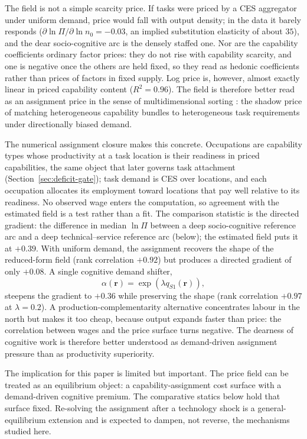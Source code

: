 \documentclass[12pt, a4paper]{article}
\begin{document}
The field is not a simple scarcity price. If tasks were priced by a CES
aggregator under uniform demand, price would fall with output density;
in the data it barely responds
($\partial\ln\Pi/\partial\ln n_0 = -0.03$, an implied substitution
elasticity of about $35$), and the dear socio-cognitive arc is the
densely staffed one. Nor are the capability coefficients ordinary
factor prices: they do not rise with capability scarcity, and one is
negative once the others are held fixed, so they read as hedonic
coefficients rather than prices of factors in fixed supply. Log price
is, however, almost exactly linear in priced capability content
($R^2 = 0.96$). The field is therefore better read as an assignment
price in the sense of multidimensional sorting \parencite{lindenlaub2017}:
the shadow price of matching heterogeneous capability bundles
to heterogeneous task requirements under directionally biased demand.

The numerical assignment closure makes this concrete. Occupations are
capability types whose productivity at a task location is their
readiness in priced capabilities, the same object that later governs
task attachment (Section~\ref{sec:deficit-gate}); task demand is CES
over locations, and each occupation allocates its employment toward
locations that pay well relative to its readiness. No observed wage
enters the computation, so agreement with the estimated field is a
test rather than a fit. The comparison statistic is the directed
gradient: the difference in median $\ln\Pi$ between a deep
socio-cognitive reference arc and a deep technical--service reference
arc (below); the estimated field puts it at
$+0.39$. With uniform demand, the assignment recovers the shape of the
reduced-form field (rank correlation $+0.92$) but produces a directed
gradient of only $+0.08$. A single cognitive demand shifter,
\[
  \alpha(\mathbf{r})
  =
  \exp(\lambda q_{S1}(\mathbf{r})),
\]
steepens the gradient to $+0.36$ while preserving the shape (rank
correlation $+0.97$ at $\lambda=0.2$). A
production-complementarity alternative concentrates labour in the north
but makes it too cheap, because output expands faster than price: the
correlation between wages and the price surface turns negative. The
dearness of cognitive work is therefore better understood as
demand-driven assignment pressure than as productivity superiority.

The implication for this paper is limited but important. The price field
can be treated as an equilibrium object: a capability-assignment cost
surface with a demand-driven cognitive premium. The comparative statics
below hold that surface fixed. Re-solving the assignment after a
technology shock is a general-equilibrium extension and is expected to
dampen, not reverse, the mechanisms studied here.
\end{document}
